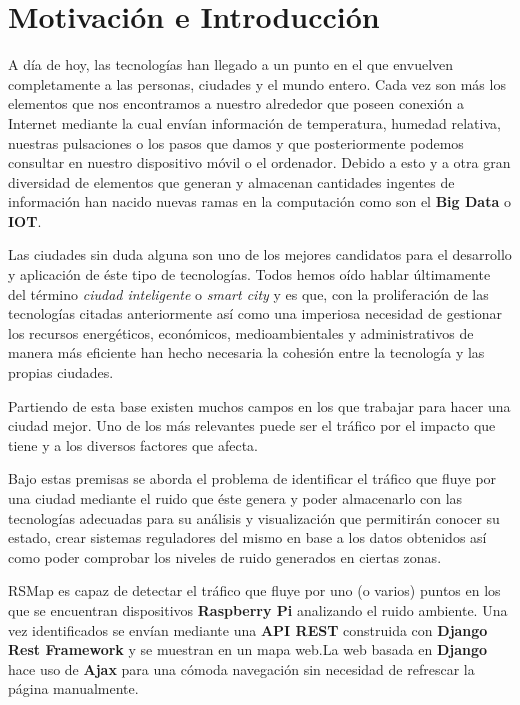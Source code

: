 \chapter{Motivación e Introducción}

A día de hoy, las tecnologías han llegado a un punto en el que envuelven completamente a las personas, ciudades y el mundo entero. Cada vez son más los elementos que nos encontramos a nuestro alrededor que poseen conexión a Internet mediante la cual envían información de temperatura, humedad relativa, nuestras pulsaciones o los pasos que damos y que posteriormente podemos consultar en nuestro dispositivo móvil o el ordenador. Debido a esto y a otra gran diversidad de elementos que generan y almacenan cantidades ingentes de información han nacido nuevas ramas en la computación como son el \textbf{Big Data} o \textbf{IOT}.

\bigskip
Las ciudades sin duda alguna son uno de los mejores candidatos para el desarrollo y aplicación de éste tipo de tecnologías. Todos hemos oído hablar últimamente del término \textit{ciudad inteligente} o \textit{smart city} y es que, con la proliferación de las tecnologías citadas anteriormente así como una imperiosa necesidad de gestionar los recursos energéticos, económicos, medioambientales y administrativos de manera más eficiente han hecho necesaria la cohesión entre la tecnología y las propias ciudades.

\bigskip
Partiendo de esta base existen muchos campos en los que trabajar para hacer una ciudad mejor. Uno de los más relevantes puede ser el tráfico por el impacto que tiene y a los diversos factores que afecta.

\bigskip
Bajo estas premisas se aborda el problema de identificar el tráfico que fluye por una ciudad mediante el ruido que éste genera y poder almacenarlo con las tecnologías adecuadas para su análisis y visualización que permitirán conocer su estado, crear sistemas reguladores del mismo en base a los datos obtenidos así como poder comprobar los niveles de ruido generados en ciertas zonas.

\newpage

RSMap es capaz de detectar el tráfico que fluye por uno (o varios) puntos en los que se encuentran dispositivos  \textbf{Raspberry Pi} analizando el ruido ambiente. Una vez identificados se envían mediante una \textbf{API REST} construida con \textbf{Django Rest Framework} y se  muestran en un mapa web.La web basada en \textbf{Django} hace uso de \textbf{Ajax} para una cómoda navegación sin necesidad de refrescar la página manualmente.

